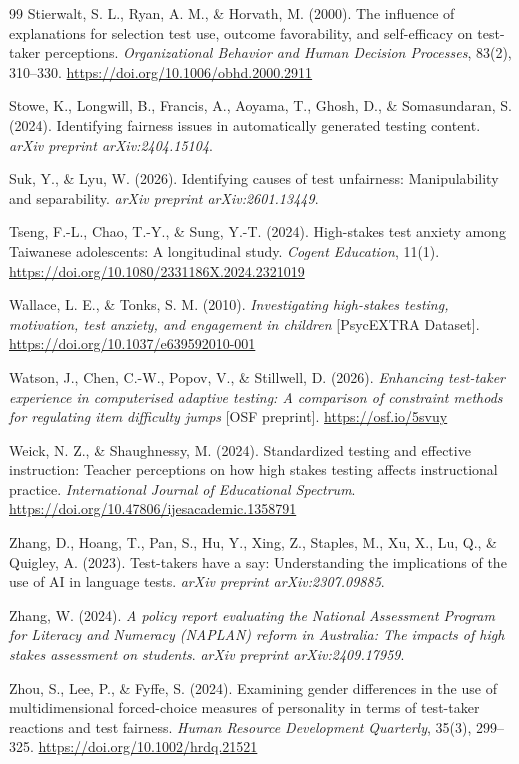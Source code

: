 \documentclass[11pt]{article}
\begin{document}
\begin{thebibliography}{99}
Stierwalt, S. L., Ryan, A. M., \& Horvath, M. (2000). The influence of explanations for selection test use, outcome favorability, and self-efficacy on test-taker perceptions. \textit{Organizational Behavior and Human Decision Processes}, 83(2), 310--330. \url{https://doi.org/10.1006/obhd.2000.2911}

Stowe, K., Longwill, B., Francis, A., Aoyama, T., Ghosh, D., \& Somasundaran, S. (2024). Identifying fairness issues in automatically generated testing content. \textit{arXiv preprint arXiv:2404.15104}.

Suk, Y., \& Lyu, W. (2026). Identifying causes of test unfairness: Manipulability and separability. \textit{arXiv preprint arXiv:2601.13449}.

Tseng, F.-L., Chao, T.-Y., \& Sung, Y.-T. (2024). High-stakes test anxiety among Taiwanese adolescents: A longitudinal study. \textit{Cogent Education}, 11(1). \url{https://doi.org/10.1080/2331186X.2024.2321019}

Wallace, L. E., \& Tonks, S. M. (2010). \textit{Investigating high-stakes testing, motivation, test anxiety, and engagement in children} [PsycEXTRA Dataset]. \url{https://doi.org/10.1037/e639592010-001}

Watson, J., Chen, C.-W., Popov, V., \& Stillwell, D. (2026). \textit{Enhancing test-taker experience in computerised adaptive testing: A comparison of constraint methods for regulating item difficulty jumps} [OSF preprint]. \url{https://osf.io/5svuy}

Weick, N. Z., \& Shaughnessy, M. (2024). Standardized testing and effective instruction: Teacher perceptions on how high stakes testing affects instructional practice. \textit{International Journal of Educational Spectrum}. \url{https://doi.org/10.47806/ijesacademic.1358791}

Zhang, D., Hoang, T., Pan, S., Hu, Y., Xing, Z., Staples, M., Xu, X., Lu, Q., \& Quigley, A. (2023). Test-takers have a say: Understanding the implications of the use of AI in language tests. \textit{arXiv preprint arXiv:2307.09885}.

Zhang, W. (2024). \textit{A policy report evaluating the National Assessment Program for Literacy and Numeracy (NAPLAN) reform in Australia: The impacts of high stakes assessment on students}. \textit{arXiv preprint arXiv:2409.17959}.

Zhou, S., Lee, P., \& Fyffe, S. (2024). Examining gender differences in the use of multidimensional forced-choice measures of personality in terms of test-taker reactions and test fairness. \textit{Human Resource Development Quarterly}, 35(3), 299--325. \url{https://doi.org/10.1002/hrdq.21521}

\end{thebibliography}
\end{document}
